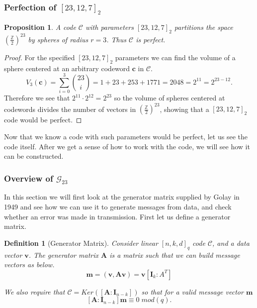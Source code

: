 \documentclass[paper=a4, fontsize=11pt]{scrartcl} %
\numberwithin{equation}{section} %
\numberwithin{figure}{section} %
\numberwithin{table}{section} %
\theoremstyle{break}
\newtheorem{defn}{Definition}
\newtheorem{prop}{Proposition}
\begin{document}
\subsubsection{Perfection of $[23,12,7]_2$}
\begin{prop}
A code $\mathcal{C}$ with parameters $[23,12,7]_2$ partitions the space $(\frac{\mathbb{Z}}{2})^{23}$ by spheres of radius $r=3$. Thus $\mathcal{C}$ is perfect.
\end{prop}

\begin{proof}
For the specified $[23,12,7]_2$ parameters we can find the volume of a sphere centered at an arbitrary codeword $\textbf{c}$ in $\mathcal{C}$.
$$
V_3(\textbf{c}) = \sum_{i=0}^{3} {23 \choose i} = 1 + 23 + 253 + 1771 = 2048 = 2^{11} = 2^{23-12}.
$$
Therefore we see that $2^{11} \cdot 2^{12} = 2^{23}$ so the volume of spheres centered at codewords divides the number of vectors in $(\frac{\mathbb{Z}}{2})^{23}$, showing that a $[23,12,7]_2$ code would be perfect.
\end{proof}

Now that we know a code with such parameters would be perfect, let us see the code itself. After we get a sense of how to work with the code, we will see how it can be constructed.

\subsubsection{Overview of $\mathcal{G}_{23}$}
In this section we will first look at the generator matrix supplied by Golay in 1949 and see how we can use it to generate messages from data, and check whether an error was made in transmission. First let us define a generator matrix.

\begin{defn}[Generator Matrix]
Consider linear $[n,k,d]_q$ code $\mathcal{C}$, and a data vector $\textbf{v}$. The generator matrix $\textbf{A}$ is a matrix such that we can build message vectors as below. 
$$
\textbf{m} = (\textbf{v},  \textbf{A} \textbf{v}) = \textbf{v} [\textbf{I}_k : A^T]
$$

We also require that $\mathcal{C} = Ker([\textbf{A} : \textbf{I}_{n-k}])$ so that for a valid message vector $\textbf{m}$
$$
[\textbf{A} : \textbf{I}_{n-k}] \textbf{m} \equiv 0 \; mod(q).
$$
\end{defn}
\end{document}
